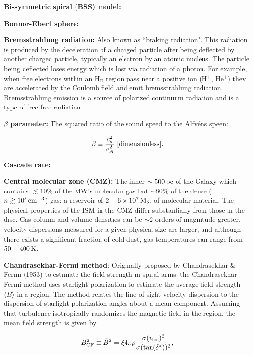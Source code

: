 \documentclass[a4paper,10pt]{article}
\begin{document}
{\noindent}\textbf{Bi-symmetric spiral (BSS) model:}

{\noindent}\textbf{Bonnor-Ebert sphere:}

{\noindent}\textbf{Bremsstrahlung radiation:} Also known as ``braking radiation". This radiation is produced by the deceleration of a charged particle after being deflected by another charged particle, typically an electron by an atomic nucleus. The particle being deflected loses energy which is lost via radiation of a photon. For example, when free electrons within an H$_\mathrm{II}$ region pass near a positive ion (H$^+$, He$^+$) they are accelerated by the Coulomb field and emit bremsstrahlung radiation. Bremsstrahlung emission is a source of polarized continuum radiation and is a type of free-free radiation.

{\noindent}\textbf{$\beta$ parameter:} The squared ratio of the sound speed to the Alfv\'ens speen:

\begin{align*}
    \beta \equiv \frac{c_s^2}{v_A^2} ~ [{\rm dimensionless}].
\end{align*}

{\noindent}\textbf{Cascade rate:}

{\noindent}\textbf{Central molecular zone (CMZ):} The inner $\sim500\,{\rm pc}$ of the Galaxy which contains $\lesssim10\%$ of the MW's molecular gas but $\sim80\%$ of the dense ($n\gtrsim10^3\,{\rm cm^{-3}}$) gas: a reservoir of $2-6\times10^7\,{\rm M_\odot}$ of molecular material. The physical properties of the ISM in the CMZ differ substantially from those in the disc. Gas column and volume densities can be $\sim2$ orders of magnitude greater, velocity dispersions measured for a given physical size are larger, and although there exists a significant fraction of cold dust, gas temperatures can range from $50-400\,{\rm K}$.

{\noindent}\textbf{Chandrasekhar-Fermi method}: Originally proposed by Chandrasekhar \& Fermi (1953) to estimate the field strength in spiral arms, the Chandrasekhar-Fermi method uses starlight polarization to estimate the average field strength $\langle B\rangle$ in a region. The method relates the line-of-sight velocity dispersion to the dispersion of starlight polarization angles about a mean component. Assuming that turbulence isotropically randomizes the magnetic field in the region, the mean field strength is given by

\begin{align*}
    B_{\rm CF}^2 \equiv \bar{B}^2 = \xi4\pi\rho \frac{\sigma(v_{\rm los})^2}{\sigma(\tan(\delta^*))^2},
\end{align*}
\end{document}
